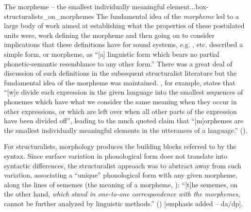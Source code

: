 \begin{dadpbox}{The morpheme -- the smallest individually meaningful element...}{box-structuralists_on_morphemes}
The fundamental idea of the \textit{morpheme} led to a large body of work aimed at establishing what the properties of these postulated units were, work defining the morpheme and then going on to consider implications that these definitions have for sound systems, e.g. \citet{Bloomfield:1933, Bloomfield:1939, Swadesh+:1939, Harris:1942, Wells:1949, Hockett:1958}, etc.  \citet[161]{Bloomfield:1933} described a  simple form, or  morpheme, as ``[a] linguistic form which bears no partial phonetic-semantic resemblance to any other form.'' There was a great deal of discussion of such definitions in the subsequent structuralist literature but the fundamental idea of the morpheme was maintained. \citet[170]{Harris:1942}, for example, states that ``[w]e divide each expression in the given language into the smallest sequences of phonemes which have what we consider the same meaning when they occur in other expressions, or which are left over when all other parts of the expression have been divided off'', leading to the  much quoted claim that ``[m]orphemes are the smallest individually meaningful elements in the utterances of a language.'' (\citealt[123]{Hockett:1958}).
\end{dadpbox}


For structuralists, morphology produces the building blocks referred to by the syntax. Since surface variation in phonological form does not translate into syntactic differences, the structuralist approach was to abstract away from such variation, associating a ``unique'' phonological form with any given morpheme, along the lines of sememes (the meaning of a morpheme, \citealt[155]{Bloomfield:1926}):  ``[t]he sememes, on the other hand, {\it which stand in one-to-one correspondence with the morphemes}, cannot be further analyzed by linguistic methods.'' (\citealt[159]{Bloomfield:1926}) [emphasis added -- da/dp].

